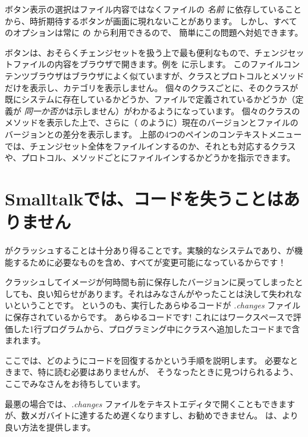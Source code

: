 \documentclass[a4paper,10pt,twoside]{book}
\begin{document}
ボタン表示の選択はファイル内容ではなくファイルの \emph{名前} に依存していることから、時折期待するボタンが画面に現れないことがあります。
しかし、すべてのオプションは常に \actclick の  から利用できるので、
簡単にこの問題へ対処できます。

 ボタンは、おそらくチェンジセットを扱う上で最も便利なもので、チェンジセットファイルの内容をブラウザで開きます。例を  に示します。
このファイルコンテンツブラウザはブラウザによく似ていますが、クラスとプロトコルとメソッドだけを表示し、カテゴリを表示しません。
個々のクラスごとに、そのクラスが既にシステムに存在しているかどうか、ファイルで定義されているかどうか（定義が \emph{同一か否か}は示しません）がわかるようになっています。
個々のクラスのメソッドを表示した上で、さらに（ のように）現在のバージョンとファイルのバージョンとの差分を表示します。
上部の4つのペインのコンテキストメニューでは、チェンジセット全体をファイルインするのか、それとも対応するクラスや、プロトコル、メソッドごとにファイルインするかどうかを指示できます。

\section{Smalltalkでは、コードを失うことはありません}

\pharo がクラッシュすることは十分あり得ることです。実験的なシステムであり、\pharo が機能するために必要なものを含め、すべてが変更可能になっているからです！


クラッシュしてイメージが何時間も前に保存したバージョンに戻ってしまったとしても、良い知らせがあります。それはみなさんがやったことは決して失われないということです。
というのも、実行したあらゆるコードが \emph{.changes} ファイルに保存されているからです。
あらゆるコードです!
これにはワークスペースで評価した1行プログラムから、プログラミング中にクラスへ追加したコードまで含まれます。

ここでは、どのようにコードを回復するかという手順を説明します。
必要なときまで、特に読む必要はありませんが、
そうなったときに見つけられるよう、ここでみなさんをお待ちしています。

最悪の場合では、\emph{.changes} ファイルをテキストエディタで開くこともできますが、数メガバイトに達するため遅くなりますし、お勧めできません。
\pharo は、より良い方法を提供します。
\end{document}
